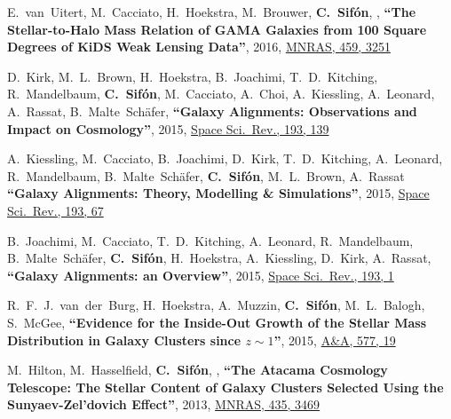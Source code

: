 \documentclass{article}
\def\myself{\textbf{\color{red} C.~Sif\'on}}
\def\aap{A\&A}
\def\mnras{MNRAS}
\def\ssr{Space Sci.\ Rev.}
\begin{document}
\vspace{-0.5cm}
\begin{etaremune}

\item E.~van~Uitert, M.~Cacciato, H.~Hoekstra, M.~Brouwer, \myself, ,
\textbf{``The Stellar-to-Halo Mass Relation of GAMA Galaxies from 100 Square Degrees of KiDS Weak Lensing Data''},
2016, \href{http://adsabs.harvard.edu/abs/2016MNRAS.459.3251V}{\mnras, 459, 3251}

\item
D.~Kirk, M.~L.~Brown, H.~Hoekstra, B.~Joachimi, T.~D.~Kitching, R.~Mandelbaum, \myself, 
M.~Cacciato, A.~Choi, A.~Kiessling, A.~Leonard, A.~Rassat, B.~Malte~Sch\"afer,
\textbf{``Galaxy Alignments: Observations and Impact on Cosmology''},
2015, \href{http://adsabs.harvard.edu/doi/10.1007/s11214-015-0213-4}{\ssr, 193, 139}

\item
A.~Kiessling, M.~Cacciato, B.~Joachimi, D.~Kirk, T.~D.~Kitching, A.~Leonard, R.~Mandelbaum, 
B.~Malte~Sch\"afer, \myself, M.~L.~Brown, A.~Rassat
\textbf{``Galaxy Alignments: Theory, Modelling \& Simulations''},
2015, \href{http://adsabs.harvard.edu/doi/10.1007/s11214-015-0203-6}{\ssr, 193, 67}

\item
B.~Joachimi, M.~Cacciato, T.~D.~Kitching, A.~Leonard, R.~Mandelbaum, B.~Malte~Sch\"afer, \myself, 
H.~Hoekstra, A.~Kiessling, D.~Kirk, A.~Rassat,
\textbf{``Galaxy Alignments: an Overview''},
2015, \href{http://adsabs.harvard.edu/doi/10.1007/s11214-015-0177-4}{\ssr, 193, 1}

\item
R.~F.~J.~van~der~Burg, H.~Hoekstra, A.~Muzzin, \myself, M.~L.~Balogh, S.~McGee,
\textbf{``Evidence for the Inside-Out Growth of the Stellar Mass Distribution in Galaxy Clusters 
since $z\sim1$''},
2015, \href{http://adsabs.harvard.edu/adsabs/abs/2015A&A...577A..19V}{\aap, 577, 19}

\item
M.~Hilton, M.~Hasselfield, \myself, ,
\textbf{``The Atacama Cosmology Telescope: The Stellar Content of Galaxy Clusters Selected Using the 
Sunyaev-Zel'dovich Effect''},
2013, \href{https://ui.adsabs.harvard.edu/#abs/2013MNRAS.435.3469H/abstract}{\mnras, 435, 3469}


\end{etaremune}
\end{document}

